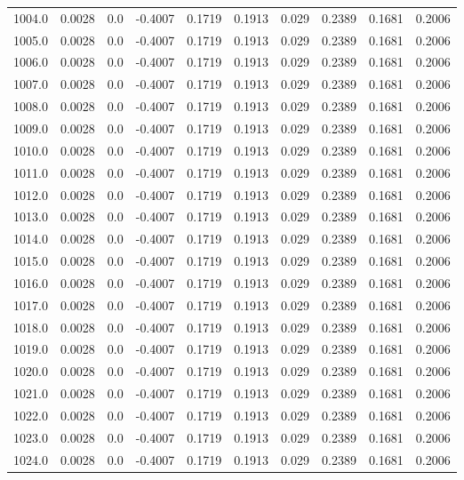 \begin{longtable}{lrrrrrrrrr}
1004.0 & 0.0028 & 0.0 & -0.4007 & 0.1719 & 0.1913 & 0.029 & 0.2389 & 0.1681 & 0.2006 \\
1005.0 & 0.0028 & 0.0 & -0.4007 & 0.1719 & 0.1913 & 0.029 & 0.2389 & 0.1681 & 0.2006 \\
1006.0 & 0.0028 & 0.0 & -0.4007 & 0.1719 & 0.1913 & 0.029 & 0.2389 & 0.1681 & 0.2006 \\
1007.0 & 0.0028 & 0.0 & -0.4007 & 0.1719 & 0.1913 & 0.029 & 0.2389 & 0.1681 & 0.2006 \\
1008.0 & 0.0028 & 0.0 & -0.4007 & 0.1719 & 0.1913 & 0.029 & 0.2389 & 0.1681 & 0.2006 \\
1009.0 & 0.0028 & 0.0 & -0.4007 & 0.1719 & 0.1913 & 0.029 & 0.2389 & 0.1681 & 0.2006 \\
1010.0 & 0.0028 & 0.0 & -0.4007 & 0.1719 & 0.1913 & 0.029 & 0.2389 & 0.1681 & 0.2006 \\
1011.0 & 0.0028 & 0.0 & -0.4007 & 0.1719 & 0.1913 & 0.029 & 0.2389 & 0.1681 & 0.2006 \\
1012.0 & 0.0028 & 0.0 & -0.4007 & 0.1719 & 0.1913 & 0.029 & 0.2389 & 0.1681 & 0.2006 \\
1013.0 & 0.0028 & 0.0 & -0.4007 & 0.1719 & 0.1913 & 0.029 & 0.2389 & 0.1681 & 0.2006 \\
1014.0 & 0.0028 & 0.0 & -0.4007 & 0.1719 & 0.1913 & 0.029 & 0.2389 & 0.1681 & 0.2006 \\
1015.0 & 0.0028 & 0.0 & -0.4007 & 0.1719 & 0.1913 & 0.029 & 0.2389 & 0.1681 & 0.2006 \\
1016.0 & 0.0028 & 0.0 & -0.4007 & 0.1719 & 0.1913 & 0.029 & 0.2389 & 0.1681 & 0.2006 \\
1017.0 & 0.0028 & 0.0 & -0.4007 & 0.1719 & 0.1913 & 0.029 & 0.2389 & 0.1681 & 0.2006 \\
1018.0 & 0.0028 & 0.0 & -0.4007 & 0.1719 & 0.1913 & 0.029 & 0.2389 & 0.1681 & 0.2006 \\
1019.0 & 0.0028 & 0.0 & -0.4007 & 0.1719 & 0.1913 & 0.029 & 0.2389 & 0.1681 & 0.2006 \\
1020.0 & 0.0028 & 0.0 & -0.4007 & 0.1719 & 0.1913 & 0.029 & 0.2389 & 0.1681 & 0.2006 \\
1021.0 & 0.0028 & 0.0 & -0.4007 & 0.1719 & 0.1913 & 0.029 & 0.2389 & 0.1681 & 0.2006 \\
1022.0 & 0.0028 & 0.0 & -0.4007 & 0.1719 & 0.1913 & 0.029 & 0.2389 & 0.1681 & 0.2006 \\
1023.0 & 0.0028 & 0.0 & -0.4007 & 0.1719 & 0.1913 & 0.029 & 0.2389 & 0.1681 & 0.2006 \\
1024.0 & 0.0028 & 0.0 & -0.4007 & 0.1719 & 0.1913 & 0.029 & 0.2389 & 0.1681 & 0.2006 \\

\end{longtable}
